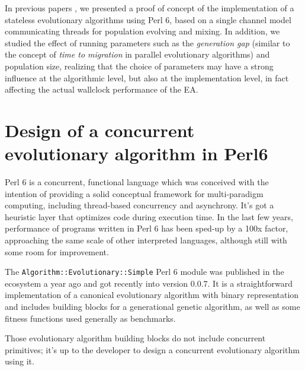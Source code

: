 \documentclass[runningheads]{llncs}\usepackage[]{graphicx}\usepackage[]{color}
\begin{document}
In previous papers 
\cite{Merelo:2018:MEA:3205651.3208317:anon,Garcia-Valdez:2018:MEA:3205651.3205719:anon},
we presented a proof of concept of the implementation of a stateless 
evolutionary algorithms using Perl 6, based on a single 
channel model communicating threads for population evolving and 
mixing. In addition, we studied the effect of running parameters 
such as the {\em generation gap} (similar to the concept of {\em
time to migration} in parallel evolutionary algorithms) and 
population size, realizing that the choice of parameters may have 
a strong influence at the algorithmic level, but also at the 
implementation level, in fact affecting the actual wallclock
performance of the EA.

\section{Design of a concurrent evolutionary algorithm in Perl6}

Perl 6 is a concurrent, functional language
\cite{DBLP:journals/corr/abs-1809-01427} which was conceived with the
intention of providing a solid conceptual framework for multi-paradigm
computing, including thread-based concurrency and asynchrony. It's got
a heuristic layer that optimizes code during execution time. In the last few
years, performance of programs written in Perl 6 has been sped-up by a 100x factor, approaching the same scale of other interpreted
languages, although still with some room for improvement.

The {\tt Algorithm::Evolutionary::Simple} Perl 6 module was published
in the ecosystem a year ago and got recently into version 0.0.7. It
is a straightforward implementation of a canonical evolutionary
algorithm with binary representation and includes building blocks for
a generational genetic algorithm, as well as some fitness functions
used generally as benchmarks.

Those evolutionary algorithm building blocks do not include concurrent
primitives; it's up to the developer to design a concurrent
evolutionary algorithm using it.
\end{document}
